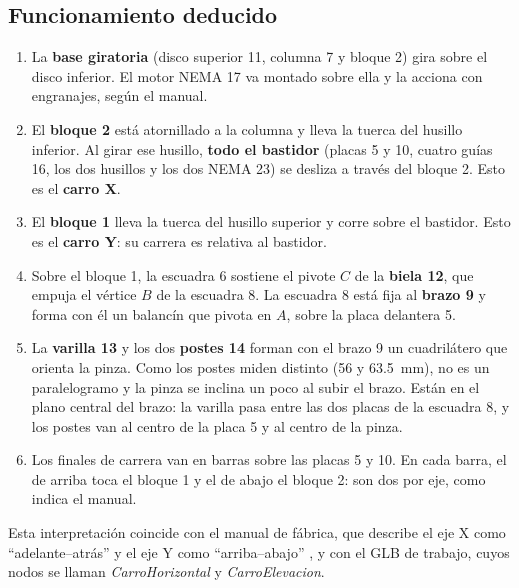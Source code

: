 \documentclass[a4paper,12pt]{article}
\begin{document}
\subsection{Funcionamiento deducido}
\begin{enumerate}
\item La \textbf{base giratoria} (disco superior 11, columna 7 y bloque 2) gira sobre el disco inferior. El
      motor NEMA 17 va montado sobre ella y la acciona con engranajes, según el manual.
\item El \textbf{bloque 2} está atornillado a la columna y lleva la tuerca del husillo inferior. Al girar
      ese husillo, \textbf{todo el bastidor} (placas 5 y 10, cuatro guías 16, los dos husillos y los dos NEMA 23)
      se desliza a través del bloque 2. Esto es el \textbf{carro X}.
\item El \textbf{bloque 1} lleva la tuerca del husillo superior y corre sobre el bastidor. Esto es el
      \textbf{carro Y}: su carrera es relativa al bastidor.
\item Sobre el bloque 1, la escuadra 6 sostiene el pivote $C$ de la \textbf{biela 12}, que empuja el vértice
      $B$ de la escuadra 8. La escuadra 8 está fija al \textbf{brazo 9} y forma con él un balancín que
      pivota en $A$, sobre la placa delantera 5.
\item La \textbf{varilla 13} y los dos \textbf{postes 14} forman con el brazo 9 un cuadrilátero que orienta la
      pinza. Como los postes miden distinto (56 y 63.5~mm), no es un paralelogramo y la pinza se inclina un
      poco al subir el brazo. Están en el plano central del brazo: la varilla pasa entre las dos placas
      de la escuadra 8, y los postes van al centro de la placa 5 y al centro de la pinza.
\item Los finales de carrera van en barras sobre las placas 5 y 10. En cada barra, el de arriba toca el
      bloque 1 y el de abajo el bloque 2: son dos por eje, como indica el manual.
\end{enumerate}
Esta interpretación coincide con el manual de fábrica, que describe el eje X como ``adelante--atrás'' y el
eje Y como ``arriba--abajo'' \cite{manual}, y con el GLB de trabajo, cuyos nodos se llaman
\emph{CarroHorizontal} y \emph{CarroElevacion}.
\end{document}
